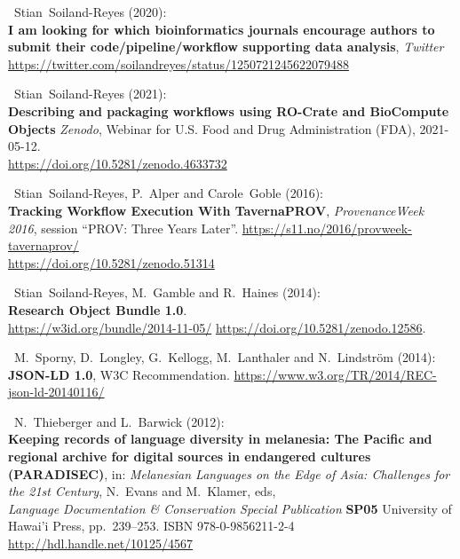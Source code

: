 \begin{thebibliography}{9}
~Stian~Soiland-Reyes (2020):\\
\textbf{I am looking for which bioinformatics journals encourage authors
to submit their code/pipeline/workflow supporting data analysis},
\emph{Twitter}
\url{https://twitter.com/soilandreyes/status/1250721245622079488}

~Stian~Soiland-Reyes (2021):\\
\textbf{Describing and packaging workflows using RO-Crate and BioCompute
Objects} \emph{Zenodo}, Webinar for U.S. Food and Drug Administration
(FDA), 2021-05-12.\\
\url{https://doi.org/10.5281/zenodo.4633732}

~Stian~Soiland-Reyes, P.~Alper and Carole~Goble (2016):\\
\textbf{Tracking Workflow Execution With TavernaPROV},
\emph{ProvenanceWeek 2016}, session ``PROV: Three Years Later''.
\url{https://s11.no/2016/provweek-tavernaprov/}\\
\url{https://doi.org/10.5281/zenodo.51314}

~Stian~Soiland-Reyes, M.~Gamble and R.~Haines (2014):\\
\textbf{Research Object Bundle 1.0}.\\
\url{https://w3id.org/bundle/2014-11-05/}
\url{https://doi.org/10.5281/zenodo.12586}.

~M.~Sporny, D.~Longley, G.~Kellogg, M.~Lanthaler and
N.~Lindström (2014):\\
\textbf{JSON-LD 1.0}, W3C Recommendation.
\url{https://www.w3.org/TR/2014/REC-json-ld-20140116/}


~N.~Thieberger and L.~Barwick (2012):\\
\textbf{Keeping records of language diversity in melanesia: The Pacific
and regional archive for digital sources in endangered cultures
(PARADISEC)}, in: \emph{Melanesian Languages on the Edge of Asia:
Challenges for the 21st Century}, N.~Evans and M.~Klamer, eds,\\
\emph{Language Documentation \& Conservation Special Publication}
\textbf{SP05} University of Hawai'i Press, pp.~239--253. ISBN
978-0-9856211-2-4\\
\url{http://hdl.handle.net/10125/4567}


\end{thebibliography}
